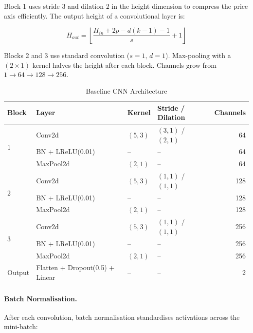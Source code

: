 Block 1 uses stride 3 and dilation 2 in the height dimension to compress the price axis efficiently. The output height of a convolutional layer is:

\begin{equation}
H_{out} = \left\lfloor \frac{H_{in} + 2p - d(k-1) - 1}{s} + 1 \right\rfloor
\label{eq:conv_out}
\end{equation}

Blocks 2 and 3 use standard convolution ($s=1$, $d=1$). Max-pooling with a $(2 \times 1)$ kernel halves the height after each block. Channels grow from $1 \to 64 \to 128 \to 256$.

\begin{table}[H]
\centering
\caption{Baseline CNN Architecture}
\label{tab:baseline_arch}
\begin{tabular}{llllr}
\toprule
\textbf{Block} & \textbf{Layer} & \textbf{Kernel} & \textbf{Stride / Dilation} & \textbf{Channels} \\
\midrule
\multirow{3}{*}{1} & Conv2d     & $(5,3)$ & $(3,1)$ / $(2,1)$ & 64  \\
                   & BN + LReLU(0.01) & --  & --                & 64  \\
                   & MaxPool2d  & $(2,1)$ & --                & 64  \\
\midrule
\multirow{3}{*}{2} & Conv2d     & $(5,3)$ & $(1,1)$ / $(1,1)$ & 128 \\
                   & BN + LReLU(0.01) & --  & --                & 128 \\
                   & MaxPool2d  & $(2,1)$ & --                & 128 \\
\midrule
\multirow{3}{*}{3} & Conv2d     & $(5,3)$ & $(1,1)$ / $(1,1)$ & 256 \\
                   & BN + LReLU(0.01) & --  & --                & 256 \\
                   & MaxPool2d  & $(2,1)$ & --                & 256 \\
\midrule
Output & Flatten + Dropout(0.5) + Linear & -- & -- & 2 \\
\bottomrule
\end{tabular}
\end{table}

\paragraph{Batch Normalisation.}
After each convolution, batch normalisation \parencite{ioffe2015} standardises activations across the mini-batch:

